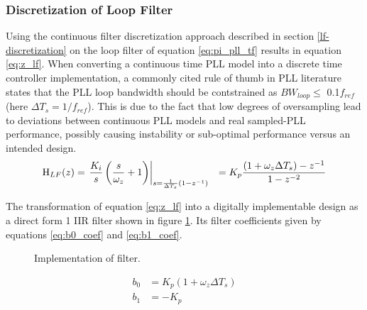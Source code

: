 	\subsubsection{Discretization of Loop Filter}\label{disc_lf_comp_pi}
		Using the continuous filter discretization approach described in section \ref{lf-discretization} on the loop filter of equation \ref{eq:pi_pll_tf} results in equation \ref{eq:z_lf}. When converting a continuous time PLL model into a discrete time controller implementation, a commonly cited rule of thumb in PLL literature states that the PLL loop bandwidth should be contstrained as $BW_{loop} \leq$  0.1$f_{ref}$ \cite{gardner_1980} (here $\Delta T_s = 1/f_{ref}$). This is due to the fact that low degrees of oversampling lead to deviations between continuous PLL models and real sampled-PLL performance, possibly causing instability or sub-optimal performance versus an intended design.
		\begin{align}
			\textnormal{H}_{LF}(z) & = \left.\frac{K_i}{s}\left(\frac{s}{\omega_z} + 1\right)\right\vert_{s=\frac{1}{\Delta T_s}(1-z^{-1})}
			&= K_p\frac{(1+\omega_z\Delta T_s)-z^{-1}}{1- z^{-2}}\label{eq:z_lf}
		\end{align}

		The transformation of equation \ref{eq:z_lf} into a digitally implementable design as a direct form 1 IIR filter shown in figure \ref{fig:filt_imple}. Its filter coefficients given by equations \ref{eq:b0_coef} and \ref{eq:b1_coef}.
		\begin{figure}[htb!]
			\center
			\caption{Implementation of filter.}
			\label{fig:filt_imple}
		\end{figure}

		\begin{align}
			b_0 &= K_p (1+\omega_z\Delta T_s) \label{eq:b0_coef}\\
			 b_1 &= -K_p \label{eq:b1_coef}
		\end{align}

